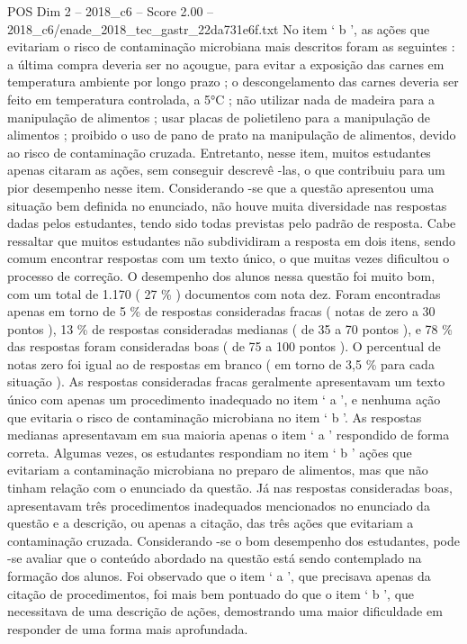 \begin{textsample}{POS Dim 2 – 2018\_c6 – Score 2.00 – 2018\_c6/enade\_2018\_tec\_gastr\_22da731e6f.txt}
No item ‘ b ’, as ações que evitariam o risco de contaminação microbiana mais descritos foram as seguintes : a última compra deveria ser no açougue, para evitar a exposição das carnes em temperatura ambiente por longo prazo ; o descongelamento das carnes deveria ser feito em temperatura controlada, a 5{\EmojiFont °}C ; não utilizar nada de madeira para a manipulação de alimentos ; usar placas de polietileno para a manipulação de alimentos ; proibido o uso de pano de prato na manipulação de alimentos, devido ao risco de contaminação cruzada.
Entretanto, nesse item, muitos estudantes apenas citaram as ações, sem conseguir descrevê -las, o que contribuiu para um pior desempenho nesse item.
Considerando -se que a questão apresentou uma situação bem definida no enunciado, não houve muita diversidade nas respostas dadas pelos estudantes, tendo sido todas previstas pelo padrão de resposta.
Cabe ressaltar que muitos estudantes não subdividiram a resposta em dois itens, sendo comum encontrar respostas com um texto único, o que muitas vezes dificultou o processo de correção.
O desempenho dos alunos nessa questão foi muito bom, com um total de 1.170 ( 27 \% ) documentos com nota dez.
Foram encontradas apenas em torno de 5 \% de respostas consideradas fracas ( notas de zero a 30 pontos ), 13 \% de respostas consideradas medianas ( de 35 a 70 pontos ), e 78 \% das respostas foram consideradas boas ( de 75 a 100 pontos ).
O percentual de notas zero foi igual ao de respostas em branco ( em torno de 3,5 \% para cada situação ).
As respostas consideradas fracas geralmente apresentavam um texto único com apenas um procedimento inadequado no item ‘ a ’, e nenhuma ação que evitaria o risco de contaminação microbiana no item ‘ b ’.
As respostas medianas apresentavam em sua maioria apenas o item ‘ a ’ respondido de forma correta.
Algumas vezes, os estudantes respondiam no item ‘ b ’ ações que evitariam a contaminação microbiana no preparo de alimentos, mas que não tinham relação com o enunciado da questão.
Já nas respostas consideradas boas, apresentavam três procedimentos inadequados mencionados no enunciado da questão e a descrição, ou apenas a citação, das três ações que evitariam a contaminação cruzada.
Considerando -se o bom desempenho dos estudantes, pode -se avaliar que o conteúdo abordado na questão está sendo contemplado na formação dos alunos.
Foi observado que o item ‘ a ’, que precisava apenas da citação de procedimentos, foi mais bem pontuado do que o item ‘ b ’, que necessitava de uma descrição de ações, demostrando uma maior dificuldade em responder de uma forma mais aprofundada.

\end{textsample}
